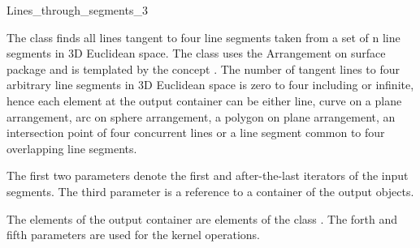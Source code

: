 \begin{ccRefFunction}{Lines_through_segments_3}

\ccDefinition

The class  finds all lines tangent to four line segments taken from a set of n line segments in 3D Euclidean space.\newline
The class uses the Arrangement on surface package and is templated by the concept .\newline
The number of tangent lines to four arbitrary line segments in 3D Euclidean space is zero to four including or infinite, hence each element at the output container can be either line, curve on a plane arrangement, arc on sphere arrangement, a polygon on plane arrangement, an intersection point of four concurrent lines or a line segment common to four overlapping line segments.\newline



The first two parameters denote the first and after-the-last iterators
of the input segments.  The third parameter is a reference to a container of the output objects. 

The elements of the output container are elements of the class .\newline
The forth and fifth parameters are used for the kernel operations.

\ccTypes
{}


\ccSeeAlso
{}\\
\\

\end{ccRefFunction}

